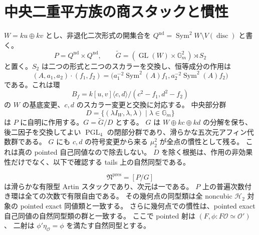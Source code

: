 \section{中央二重平方族の商スタックと慣性}
\label{sec:noncubic-stack}

$W=k u\oplus k v$ とし、非退化二次形式の開集合を
$Q^{\mathrm{nd}}=\operatorname{Sym}^2W\setminus V(\operatorname{disc})$ と書く。
\[
 P=Q^{\mathrm{nd}}\times Q^{\mathrm{nd}},\qquad
 \widetilde G=(\operatorname{GL}(W)\times\mathbb G_m^2)\rtimes S_2
\]
と置く。$S_2$ は二つの形式と二つのスカラーを交換し、恒等成分の作用は
\[
 (A,a_1,a_2)\cdot(f_1,f_2)
 =\bigl(a_1^{-2}\operatorname{Sym}^2(A)f_1,
        a_2^{-2}\operatorname{Sym}^2(A)f_2\bigr)
\]
である。これは環
\[
 B_f=k[u,v]\langle c,d\rangle/(c^2-f_1,d^2-f_2)
\]
の $W$ の基底変更、$c,d$ のスカラー変更と交換に対応する。
中央部分群
\[
 D=\{(\lambda I_W,\lambda,\lambda)\mid\lambda\in\mathbb G_m\}
\]
は $P$ に自明に作用する。$G=\widetilde G/D$ とする。
$G$ は $W\oplus kc\oplus kd$ の分解を保ち、後二因子を交換してよい
$\operatorname{PGL}_4$ の閉部分群であり、滑らかな五次元アフィン代数群である。
$G$ にも $c,d$ の符号変更から来る $\mu_2^2$ が全点の慣性として残る。
これは真の pointed 自己同値なので除去しない。
$D$ を除く根拠は、作用の非効果性だけでなく、以下で確認する tails 上の自然同型である。

\begin{proposition}[表示から構成するスタック]
\label{prop:noncubic-presentation-stack}
\[
 \mathfrak N^{\mathrm{pres}}=[P/G]
\]
は滑らかな有限型 Artin スタックであり、次元は一である。
$P$ 上の普遍次数付き環は全ての次数で有限自由である。
その幾何点の同型類は全 noncubic $\mathcal H_2$ 対象の pointed exact 同値類と一致する。
さらに幾何点での慣性は、pointed exact 自己同値の自然同型類の群と一致する。
ここで pointed 射は $(F,\phi:F\mathcal O\simeq\mathcal O')$、
二射は $\phi'\eta_{\mathcal O}=\phi$ を満たす自然同型とする。
\end{proposition}

